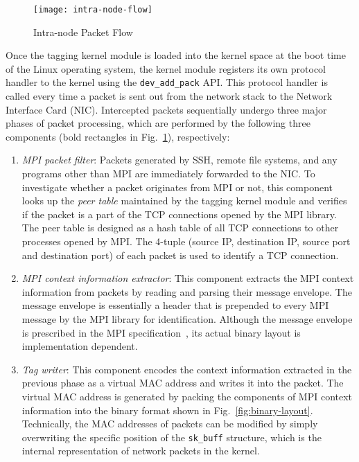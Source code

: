 \begin{figure}
    \centering
    \texttt{[image: intra-node-flow]}
    \caption{Intra-node Packet Flow}%
    \label{fig:intra-node-flow}
\end{figure}

Once the tagging kernel module is loaded into the kernel space at the
boot time of the Linux operating system, the kernel module registers its
own protocol handler to the kernel using the
\lstinline!dev_add_pack! API\@. This protocol handler is
called every time a packet is sent out from the network stack to the
Network Interface Card (NIC). Intercepted packets sequentially undergo
three major phases of packet processing, which are performed by the
following three components (bold rectangles in
Fig.~\ref{fig:intra-node-flow}), respectively:

\begin{enumerate}
\def\labelenumi{\arabic{enumi}.}
\item
  \emph{MPI packet filter}: Packets generated by SSH, remote file
  systems, and any programs other than MPI are immediately forwarded to
  the NIC\@. To investigate whether a packet originates from MPI or not,
  this component looks up the \emph{peer table} maintained by the
  tagging kernel module and verifies if the packet is a part of the TCP
  connections opened by the MPI library. The peer table is designed as a
  hash table of all TCP connections to other processes opened by MPI\@.
  The 4-tuple (source IP, destination IP, source port and destination
  port) of each packet is used to identify a TCP connection.
\item
  \emph{MPI context information extractor}: This component extracts the
  MPI context information from packets by reading and parsing their
  message envelope. The message envelope is essentially a header that is
  prepended to every MPI message by the MPI library for identification.
  Although the message envelope is prescribed in the MPI
  specification~\autocite{MessagePassingInterfaceForum2015}, its actual binary
  layout is implementation dependent.
\item
  \emph{Tag writer}: This component encodes the context information
  extracted in the previous phase as a virtual MAC address and writes it
  into the packet. The virtual MAC address is generated by packing the
  components of MPI context information into the binary format shown in
  Fig.~\ref{fig:binary-layout}. Technically, the MAC addresses of
  packets can be modified by simply overwriting the specific position of
  the \lstinline!sk_buff! structure, which is the
  internal representation of network packets in the kernel.
\end{enumerate}

